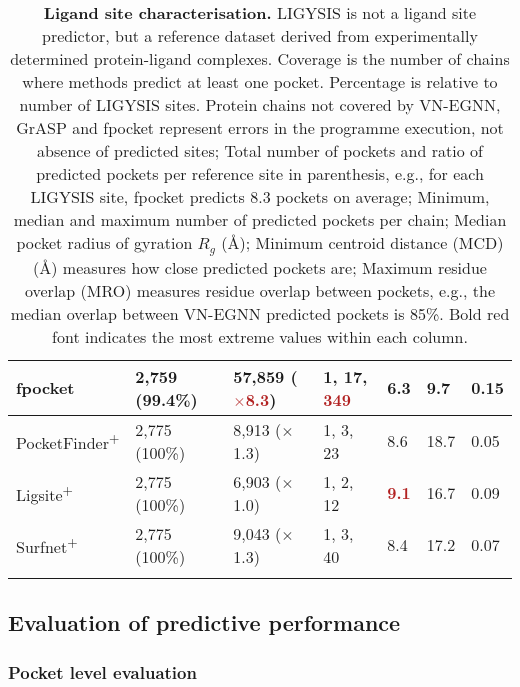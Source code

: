 \begin{landscape}
\begin{longtable}[c]{|M{28mm}|M{29mm}|M{29mm}|M{37mm}|M{28mm}|M{28mm}|M{20mm}|}
fpocket       & 2,759 (99.4\%) & 57,859 (\textbf{\textcolor{firebrick}{$\times$8.3}}) & 1, 17, \textbf{\textcolor{firebrick}{349}}          & 6.3                              & 9.7                          & 0.15 \\ \hline
PocketFinder\textsuperscript{+} & 2,775 (100\%)   & 8,913 ($\times$1.3)  & 1, 3, 23            & 8.6                              & 18.7                         & 0.05 \\ \hline
Ligsite\textsuperscript{+}      & 2,775 (100\%)   & 6,903 ($\times$1.0)  & 1, 2, 12            & \textbf{\textcolor{firebrick}{9.1}} & 16.7                         & 0.09 \\ \hline
Surfnet\textsuperscript{+}      & 2,775 (100\%)   & 9,043 ($\times$1.3)  & 1, 3, 40            & 8.4                              & 17.2                         & 0.07 \\ \hline
\caption[Ligand site characterisation]{\textbf{Ligand site characterisation.} LIGYSIS is not a ligand site predictor, but a reference dataset derived from experimentally determined protein-ligand complexes. Coverage is the number of chains where methods predict at least one pocket. Percentage is relative to number of LIGYSIS sites. Protein chains not covered by VN-EGNN, GrASP and fpocket represent errors in the programme execution, not absence of predicted sites; Total number of pockets and ratio of predicted pockets per reference site in parenthesis, e.g., for each LIGYSIS site, fpocket predicts 8.3 pockets on average; Minimum, median and maximum number of predicted pockets per chain; Median pocket radius of gyration $R_{g}$ (\AA{}); Minimum centroid distance (MCD) (\AA{}) measures how close predicted pockets are; Maximum residue overlap (MRO) measures residue overlap between pockets, e.g., the median overlap between VN-EGNN predicted pockets is 85\%. Bold red font indicates the most extreme values within each column.}
\label{tab:pocket_features_stats}\\
\end{longtable}
\end{landscape}

\subsection{Evaluation of predictive performance}

\subsubsection{Pocket level evaluation}

